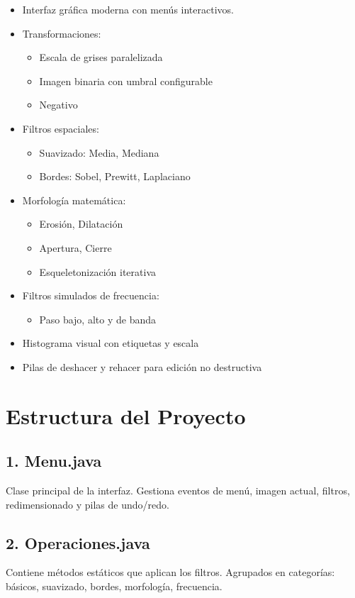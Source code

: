 \documentclass[12pt]{article}
\begin{document}
\begin{itemize}
    \item Interfaz gráfica moderna con menús interactivos.
    \item Transformaciones:
    \begin{itemize}
        \item Escala de grises paralelizada
        \item Imagen binaria con umbral configurable
        \item Negativo
    \end{itemize}
    \item Filtros espaciales:
    \begin{itemize}
        \item Suavizado: Media, Mediana
        \item Bordes: Sobel, Prewitt, Laplaciano
    \end{itemize}
    \item Morfología matemática:
    \begin{itemize}
        \item Erosión, Dilatación
        \item Apertura, Cierre
        \item Esqueletonización iterativa
    \end{itemize}
    \item Filtros simulados de frecuencia:
    \begin{itemize}
        \item Paso bajo, alto y de banda
    \end{itemize}
    \item Histograma visual con etiquetas y escala
    \item Pilas de deshacer y rehacer para edición no destructiva
\end{itemize}

\section{Estructura del Proyecto}

\subsection*{1. Menu.java}
Clase principal de la interfaz. Gestiona eventos de menú, imagen actual, filtros, redimensionado y pilas de undo/redo.

\subsection*{2. Operaciones.java}
Contiene métodos estáticos que aplican los filtros. Agrupados en categorías: básicos, suavizado, bordes, morfología, frecuencia.
\end{document}
